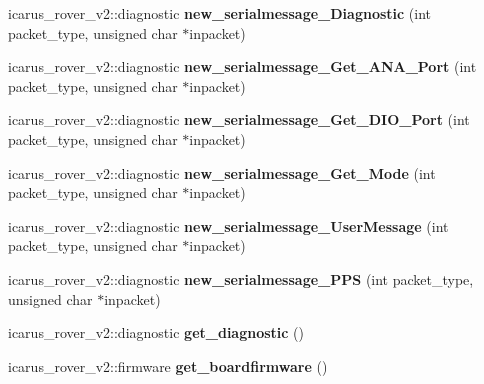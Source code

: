 \begin{DoxyCompactItemize}
icarus\+\_\+rover\+\_\+v2\+::diagnostic {\bfseries new\+\_\+serialmessage\+\_\+\+Diagnostic} (int packet\+\_\+type, unsigned char $\ast$inpacket)
\item 
\mbox{\label{classBoardControllerNodeProcess_a36da1e6cf79657d4fdc5ff7ce52b8e43}} 
icarus\+\_\+rover\+\_\+v2\+::diagnostic {\bfseries new\+\_\+serialmessage\+\_\+\+Get\+\_\+\+A\+N\+A\+\_\+\+Port} (int packet\+\_\+type, unsigned char $\ast$inpacket)
\item 
\mbox{\label{classBoardControllerNodeProcess_ae0d9cc34d55d1670983c948cc7e5e294}} 
icarus\+\_\+rover\+\_\+v2\+::diagnostic {\bfseries new\+\_\+serialmessage\+\_\+\+Get\+\_\+\+D\+I\+O\+\_\+\+Port} (int packet\+\_\+type, unsigned char $\ast$inpacket)
\item 
\mbox{\label{classBoardControllerNodeProcess_a69df8a8e28ba92372c3c99a28fe93472}} 
icarus\+\_\+rover\+\_\+v2\+::diagnostic {\bfseries new\+\_\+serialmessage\+\_\+\+Get\+\_\+\+Mode} (int packet\+\_\+type, unsigned char $\ast$inpacket)
\item 
\mbox{\label{classBoardControllerNodeProcess_a9e7d1c5467cdb389c870705a11076c4e}} 
icarus\+\_\+rover\+\_\+v2\+::diagnostic {\bfseries new\+\_\+serialmessage\+\_\+\+User\+Message} (int packet\+\_\+type, unsigned char $\ast$inpacket)
\item 
\mbox{\label{classBoardControllerNodeProcess_ae3903af3b00c6ec055f1a9e34b5bd3dc}} 
icarus\+\_\+rover\+\_\+v2\+::diagnostic {\bfseries new\+\_\+serialmessage\+\_\+\+P\+PS} (int packet\+\_\+type, unsigned char $\ast$inpacket)
\item 
\mbox{\label{classBoardControllerNodeProcess_acf105e10d58c81fe4e055416489b09a0}} 
icarus\+\_\+rover\+\_\+v2\+::diagnostic {\bfseries get\+\_\+diagnostic} ()
\item 
\mbox{\label{classBoardControllerNodeProcess_a6fa576bef545c93b1f0a800a93dc1a84}} 
icarus\+\_\+rover\+\_\+v2\+::firmware {\bfseries get\+\_\+boardfirmware} ()
\item 
\mbox{\label{classBoardControllerNodeProcess_a1039faac650cca33fe28f6ed2028b12a}} 

\end{DoxyCompactItemize}
